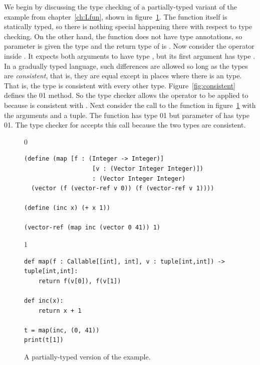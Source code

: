 \documentclass[7x10]{TimesAPriori_MIT}%
\def\racketEd{0}
\def\pythonEd{1}
\def\edition{0}
\newcommand{\racket}[1]{{\if\edition\racketEd{#1}\fi}}
\newcommand{\python}[1]{{\if\edition\pythonEd #1\fi}}
\numberwithin{theorem}{chapter}
\numberwithin{definition}{chapter}
\numberwithin{equation}{chapter}
\begin{document}
We begin by discussing the type checking of a partially-typed variant
of the  example from chapter~\ref{ch:Lfun}, shown in
figure~\ref{fig:gradual-map}.  The  function itself is
statically typed, so there is nothing special happening there with
respect to type checking. On the other hand, the  function
does not have type annotations, so parameter  is given the
type \CANYTY{} and the return type of  is \CANYTY{}.  Now
consider the \code{+} operator inside . It expects both
arguments to have type \INTTY{}, but its first argument 
has type \CANYTY{}.  In a gradually typed language, such differences
are allowed so long as the types are \emph{consistent}, that is, they
are equal except in places where there is an \CANYTY{} type. That is,
the type \CANYTY{} is consistent with every other type.
Figure~\ref{fig:consistent} defines the
\racket{}\python{} method.
%
So the type checker allows the \code{+} operator to be applied
to  because \CANYTY{} is consistent with \INTTY{}.
%
Next consider the call to the  function in
figure~\ref{fig:gradual-map} with the arguments  and a
tuple. The  function has type
\racket{}\python{}
but parameter  of  has type
\racket{}\python{}.
The type checker for \LangGrad{} accepts this call because the two types are
consistent.

\begin{figure}[btp]
  \begin{tcolorbox}[colback=white]
{\if\edition\racketEd
    \begin{lstlisting}
(define (map [f : (Integer -> Integer)]
                   [v : (Vector Integer Integer)])
                   : (Vector Integer Integer)
  (vector (f (vector-ref v 0)) (f (vector-ref v 1))))

(define (inc x) (+ x 1))

(vector-ref (map inc (vector 0 41)) 1)
    \end{lstlisting}
    \fi}
{\if\edition\pythonEd
\begin{lstlisting}
def map(f : Callable[[int], int], v : tuple[int,int]) -> tuple[int,int]:
    return f(v[0]), f(v[1])

def inc(x):
    return x + 1

t = map(inc, (0, 41))
print(t[1])
\end{lstlisting}
  \fi}
  \end{tcolorbox}

  \caption{A partially-typed version of the  example.}
\label{fig:gradual-map}
\end{figure}
\end{document}
